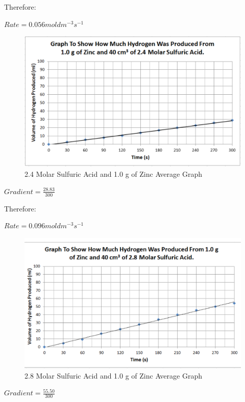 Therefore:

$Rate = 0.056 mol dm^{-3} s^{-1}$

\begin{figure}[H]
    \includegraphics[width=\textwidth]{./Analysis/Images/1NonCatalyst/24Molar.pdf}
    \caption{2.4 Molar Sulfuric Acid and 1.0 g of Zinc Average Graph} \label{fig:24MolarSAGradient}
\end{figure}

$Gradient = \frac{28.83}{300}$

Therefore:

$Rate = 0.096 mol dm^{-3} s^{-1}$

\begin{figure}[H]
    \includegraphics[width=\textwidth]{./Analysis/Images/1NonCatalyst/28Molar.pdf}
    \caption{2.8 Molar Sulfuric Acid and 1.0 g of Zinc Average Graph} \label{fig:28MolarSAGradient}
\end{figure}

$Gradient = \frac{55.50}{300}$

